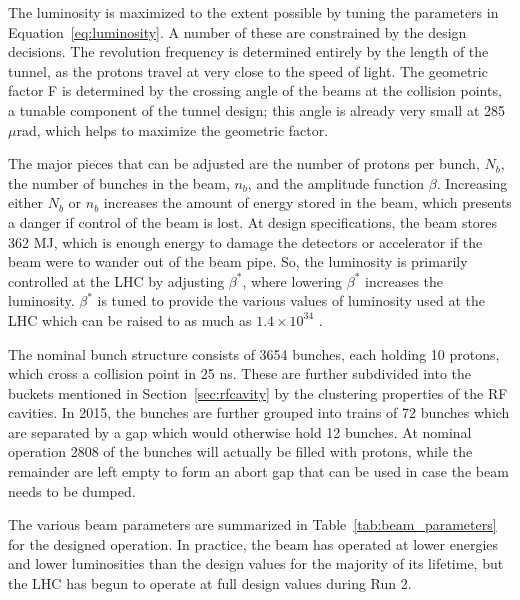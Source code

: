 The luminosity is maximized to the extent possible by tuning the parameters in Equation~\ref{eq:luminosity}.
A number of these are constrained by the design decisions.
The revolution frequency is determined entirely by the length of the tunnel, as the protons travel at very close to the speed of light.
The geometric factor F is determined by the crossing angle of the beams at the collision points, a tunable component of the tunnel design; this angle is already very small at 285 $\mu$rad, which helps to maximize the geometric factor.

The major pieces that can be adjusted are the number of protons per bunch, $N_b$, the number of bunches in the beam, $n_b$, and the amplitude function $\beta$.
Increasing either $N_b$ or $n_b$ increases the amount of energy stored in the beam, which presents a danger if control of the beam is lost.
At design specifications, the beam stores 362 MJ, which is enough energy to damage the detectors or accelerator if the beam were to wander out of the beam pipe.
So, the luminosity is primarily controlled at the \ac{LHC} by adjusting $\beta^*$, where lowering $\beta^*$ increases the luminosity.
$\beta^*$ is tuned to provide the various values of luminosity used at the \ac{LHC} which can be raised to as much as $1.4\times10^{34}$ \lcms.

The nominal bunch structure consists of 3654 bunches, each holding 10 protons, which cross a collision point in 25 ns. 
These are further subdivided into the buckets mentioned in Section~\ref{sec:rfcavity} by the clustering properties of the \ac{RF} cavities.
In 2015, the bunches are further grouped into trains of 72 bunches which are separated by a gap which would otherwise hold 12 bunches.
At nominal operation 2808 of the bunches will actually be filled with protons, while the remainder are left empty to form an abort gap that can be used in case the beam needs to be dumped.

The various beam parameters are summarized in Table~\ref{tab:beam_parameters} for the designed operation.
In practice, the beam has operated at lower energies and lower luminosities than the design values for the majority of its lifetime, but the \ac{LHC} has begun to operate at full design values during Run 2.

